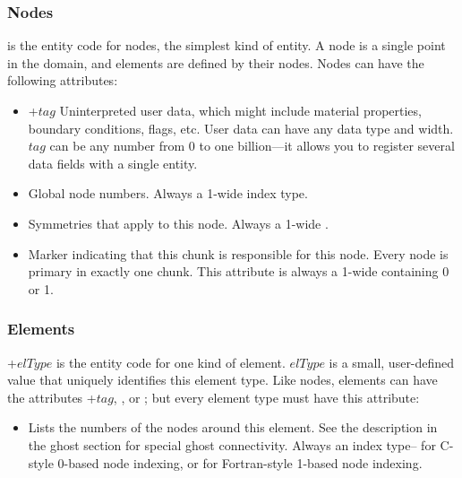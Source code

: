 \subsubsection{Nodes}
 is the entity code for nodes, the simplest kind of entity.  
A node is a single point in the domain, and elements are defined by their nodes.
Nodes can have the following attributes:

\begin{itemize}
\item {}+$tag$  Uninterpreted user data, which might
    include material properties, boundary conditions, flags, etc.
    User data can have any data type and width.
    $tag$ can be any number from 0 to one billion---it allows you
    to register several data fields with a single entity.

\item {}  Global node numbers. Always a 1-wide index type.

\item {} Symmetries that apply to this node.  
    Always a 1-wide .

\item {}  Marker indicating that this chunk is responsible 
    for this node.  Every node is primary in exactly one chunk.
    This attribute is always a 1-wide  containing 0 or 1.

\end{itemize}


\subsubsection{Elements}
+$elType$ is the entity code for one kind of element.
$elType$ is a small, user-defined value that uniquely identifies 
this element type.  Like nodes, elements can have the attributes
+$tag$, , or ;
but every element type must have this attribute:

\begin{itemize}
\item {} Lists the numbers of the nodes around this element. 
    See the description in the ghost section for special ghost connectivity.
    Always an index type-- for C-style 0-based node indexing,
    or  for Fortran-style 1-based node indexing.
\end{itemize}


